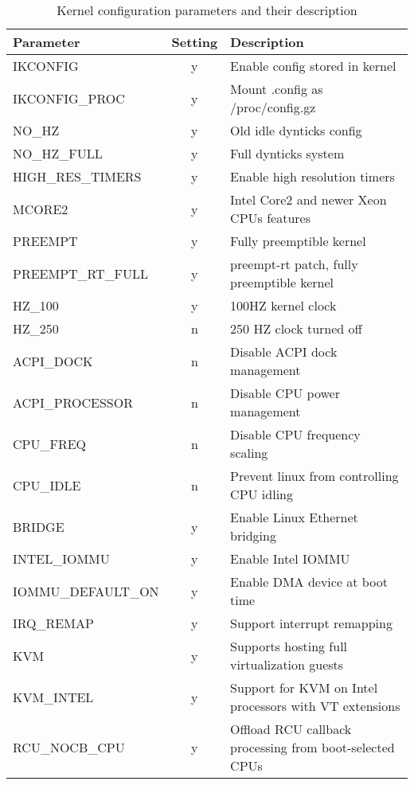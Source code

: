 \begin{table}
    \centering
    \caption{Kernel configuration parameters and their description}
    \label{tab:kernel_config_table}
\begin{tabular}{|l|c|p{8cm}|}
\hline
Parameter & Setting & Description \\
\hline 
\hline
IKCONFIG & y          &   Enable config stored in kernel \\
IKCONFIG\_PROC & y    &   Mount .config as /proc/config.gz \\
NO\_HZ & y            &   Old idle dynticks config \\
NO\_HZ\_FULL & y      &   Full dynticks system \\
HIGH\_RES\_TIMERS & y &   Enable high resolution timers\\
MCORE2 & y            &   Intel Core2 and newer Xeon CPUs features\\
PREEMPT & y           &   Fully preemptible kernel \\
PREEMPT\_RT\_FULL & y &   preempt-rt patch, fully preemptible kernel \\
HZ\_100 & y           &   100HZ kernel clock \\
HZ\_250 & n           &   250 HZ clock turned off \\
ACPI\_DOCK & n        &   Disable ACPI dock management \\
ACPI\_PROCESSOR & n   &   Disable CPU power management \\
CPU\_FREQ & n         &   Disable CPU frequency scaling \\
CPU\_IDLE & n         &   Prevent linux from controlling CPU idling \\
BRIDGE & y            &   Enable Linux Ethernet bridging \\
INTEL\_IOMMU & y      &   Enable Intel IOMMU  \\
IOMMU\_DEFAULT\_ON & y&   Enable DMA device at boot time \\
IRQ\_REMAP & y        &   Support interrupt remapping \\
KVM & y               &   Supports hosting full virtualization guests \\
KVM\_INTEL & y        &   Support for KVM on Intel processors with VT extensions \\
RCU\_NOCB\_CPU & y    &   Offload RCU callback processing from boot-selected CPUs\\
\hline
\end{tabular}
\end{table}
